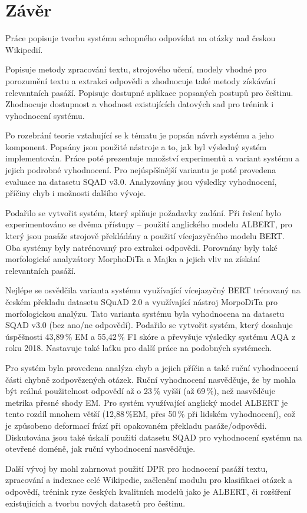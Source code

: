 
\chapter{Závěr}
\label{conclusion}
Práce popisuje tvorbu systému schopného odpovídat na otázky nad českou Wikipedií.\par
Popisuje metody zpracování textu, strojového učení, modely vhodné pro porozumění textu a extrakci odpovědi a zhodnocuje také metody získávání relevantních pasáží. Popisuje dostupné aplikace popsaných postupů pro češtinu. Zhodnocuje dostupnost a vhodnost existujících datových sad pro trénink i vyhodnocení systému.\par
Po rozebrání teorie vztahující se k tématu je popsán návrh systému a jeho komponent. Popsány jsou použité nástroje a to, jak byl výsledný systém implementován. Práce poté prezentuje množství experimentů a variant systému a jejich podrobné vyhodnocení. Pro nejúspěšnější variantu je poté provedena evaluace na datasetu SQAD v3.0. Analyzovány jsou výsledky vyhodnocení, příčiny chyb i možnosti dalšího vývoje.\par
Podařilo se vytvořit systém, který splňuje požadavky zadání. Při řešení bylo experimentováno se dvěma přístupy -- použití anglického modelu ALBERT, pro který jsou pasáže strojově překládány a použití vícejazyčného modelu BERT. Oba systémy byly natrénovaný pro extrakci odpovědi. Porovnány byly také morfologické analyzátory MorphoDiTa a Majka a jejich vliv na získání relevantních pasáží.\par
Nejlépe se osvědčila varianta systému využívající vícejazyčný BERT trénovaný na českém překladu datasetu SQuAD 2.0 a využívající nástroj MorpoDiTa pro morfologickou analýzu. Tato varianta systému byla vyhodnocena na datasetu SQAD v3.0 (bez ano/ne odpovědí). Podařilo se vytvořit systém, který dosahuje úspěšnosti 43,89\,\% EM a 55,42\,\% F1 skóre a převyšuje výsledky systému AQA z roku 2018. Nastavuje také laťku pro další práce na podobných systémech.\par
Pro systém byla provedena analýza chyb a jejich příčin a také ruční vyhodnocení části chybně zodpovězených otázek. Ruční vyhodnocení nasvědčuje, že by mohla být reálná použitelnost odpovědí až o 23\,\% vyšší (až 69\,\%), než nasvědčuje metrika přesné shody EM. Pro systém využívající anglický model ALBERT je tento rozdíl mnohem větší (12,88\,\%EM, přes 50\,\% při lidském vyhodnocení), což je způsobeno deformací frází při opakovaném překladu pasáže/odpovědi. Diskutována jsou také úskalí použití datasetu SQAD pro vyhodnocení systému na otevřené doméně, jak ruční vyhodnocení nasvědčuje.\par
Další vývoj by mohl zahrnovat použití DPR pro hodnocení pasáží textu, zpracování a indexace celé Wikipedie, začlenění modulu pro klasifikaci otázek a odpovědí, trénink ryze českých kvalitních modelů jako je ALBERT, či rozšíření existujících a tvorbu nových datasetů pro češtinu.

